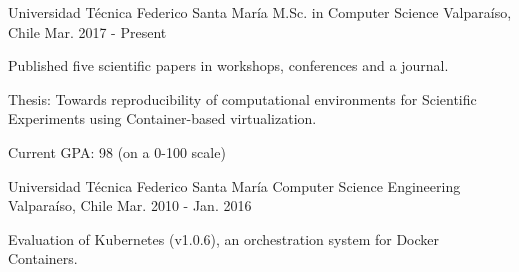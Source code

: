 \begin{cventries}
  \cventry
    {Universidad Técnica Federico Santa María}
        {M.Sc. in Computer Science}
    {Valparaíso, Chile}
    {Mar. 2017 - Present}
    {
      \begin{cvitems}
        \item {Published five scientific papers in workshops, conferences and a journal.}
        \item{Thesis: Towards reproducibility of computational environments for Scientific Experiments using Container-based virtualization.}
        \item{Current GPA: 98 (on a 0-100 scale)}
      \end{cvitems}
    }
    
  \cventry
      {Universidad Técnica Federico Santa María}
    {Computer Science Engineering}
    {Valparaíso, Chile}
    {Mar. 2010 - Jan. 2016}
    {
      \begin{cvitems}
        \item {Evaluation of Kubernetes (v1.0.6), an orchestration system for Docker Containers.}
        \end{cvitems}
    }
\end{cventries}
